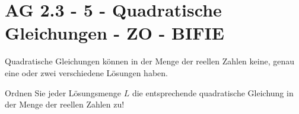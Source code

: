 \section{AG 2.3 - 5 - Quadratische Gleichungen  - ZO - BIFIE}

\begin{beispiel}[AG 2.3]{1} %
	Quadratische Gleichungen können in der Menge der reellen Zahlen keine, genau eine oder zwei verschiedene Lösungen haben.
				
\leer

Ordnen Sie jeder Lösungsmenge $L$ die entsprechende quadratische Gleichung in der Menge der reellen Zahlen zu!

\end{beispiel}